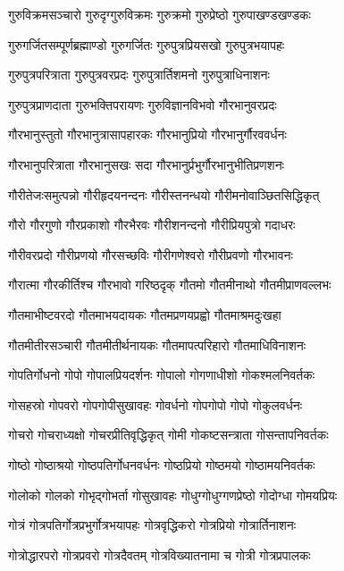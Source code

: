 \twolineshloka
{गुरुविक्रमसञ्चारो गुरुदृग्गुरुविक्रमः}%
{गुरुक्रमो गुरुप्रेष्ठो गुरुपाखण्डखण्डकः}%

\twolineshloka
{गुरुगर्जितसम्पूर्णब्रह्माण्डो गुरुगर्जितः}%
{गुरुपुत्रप्रियसखो गुरुपुत्रभयापहः}%

\twolineshloka
{गुरुपुत्रपरित्राता गुरुपुत्रवरप्रदः}%
{गुरुपुत्रार्तिशमनो गुरुपुत्राधिनाशनः}%

\twolineshloka
{गुरुपुत्रप्राणदाता गुरुभक्तिपरायणः}%
{गुरुविज्ञानविभवो गौरभानुवरप्रदः}%

\twolineshloka
{गौरभानुस्तुतो गौरभानुत्रासापहारकः}%
{गौरभानुप्रियो गौरभानुर्गौरववर्धनः}%

\twolineshloka
{गौरभानुपरित्राता गौरभानुसखः सदा}%
{गौरभानुर्प्रभुर्गौरभानुभीतिप्रणशनः}%

\twolineshloka
{गौरीतेजःसमुत्पन्नो गौरीहृदयनन्दनः}%
{गौरीस्तनन्धयो गौरीमनोवाञ्छितसिद्धिकृत्}%

\twolineshloka
{गौरो गौरगुणो गौरप्रकाशो गौरभैरवः}%
{गौरीशनन्दनो गौरीप्रियपुत्रो गदाधरः}%

\twolineshloka
{गौरीवरप्रदो गौरीप्रणयो गौरसच्छविः}%
{गौरीगणेश्वरो गौरीप्रवणो गौरभावनः}%

\twolineshloka
{गौरात्मा गौरकीर्तिश्च गौरभावो गरिष्ठदृक्}%
{गौतमो गौतमीनाथो गौतमीप्राणवल्लभः}%

\twolineshloka
{गौतमाभीष्टवरदो गौतमाभयदायकः}%
{गौतमप्रणयप्रह्वो गौतमाश्रमदुःखहा}%

\twolineshloka
{गौतमीतीरसञ्चारी गौतमीतीर्थनायकः}%
{गौतमापत्परिहारो गौतमाधिविनाशनः}%

\twolineshloka
{गोपतिर्गोधनो गोपो गोपालप्रियदर्शनः}%
{गोपालो गोगणाधीशो गोकश्मलनिवर्तकः}%

\twolineshloka
{गोसहस्रो गोपवरो गोपगोपीसुखावहः}%
{गोवर्धनो गोपगोपो गोपो गोकुलवर्धनः}%

\twolineshloka
{गोचरो गोचराध्यक्षो गोचरप्रीतिवृद्धिकृत्}%
{गोमी गोकष्टसन्त्राता गोसन्तापनिवर्तकः}%

\twolineshloka
{गोष्ठो गोष्ठाश्रयो गोष्ठपतिर्गोधनवर्धनः}%
{गोष्ठप्रियो गोष्ठमयो गोष्ठामयनिवर्तकः}%

\twolineshloka
{गोलोको गोलको गोभृद्गोभर्ता गोसुखावहः}%
{गोधुग्गोधुग्गणप्रेष्ठो गोदोग्धा गोमयप्रियः}%

\twolineshloka
{गोत्रं गोत्रपतिर्गोत्रप्रभुर्गोत्रभयापहः}%
{गोत्रवृद्धिकरो गोत्रप्रियो गोत्रार्तिनाशनः}%

\twolineshloka
{गोत्रोद्धारपरो गोत्रप्रवरो गोत्रदैवतम्}%
{गोत्रविख्यातनामा च गोत्री गोत्रप्रपालकः}%

